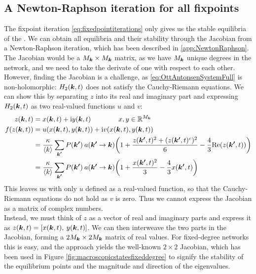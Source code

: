 \subsection{A Newton-Raphson iteration for all fixpoints}
The fixpoint iteration \eqref{eq:fixedpointiterations} only gives us the stable equilibria of the \MFR. We can obtain all equilibria and their stability through the Jacobian from a Newton-Raphson iteration, which has been described in \ref{app:NewtonRaphson}. The Jacobian would be a $M_{{\boldsymbol{k}}} \times M_{{\boldsymbol{k}}}$ matrix, as we have $M_{{\boldsymbol{k}}}$ unique degrees in the network, and we need to take the derivate of one with respect to each other. However, finding the Jacobian is a challenge, as \eqref{eq:OttAntonsenSystemFull} is non-holomorphic: $H_2({\boldsymbol{k}},t)$ does not satisfy the Cauchy-Riemann equations. We can show this by separating $z$ into its real and imaginary part and expressing $H_2({\boldsymbol{k}},t)$ as two real-valued functions $u$ and $v$:
\begin{align*}
z(\k,t) &= x(\k,t) + \ic y(\k,t) \qquad \qquad x, y \in \R^{M_{\k}}\\
f\left( z(\k,t) \right) &= u\left(x(\k, t), y(\k, t) \right) + \ic v\left(x(\k, t), y(\k, t) \right)\\
&= \frac{\kappa}{\kmean} \sum_{\kacc} P\left(\kacc\right) \: a\left(\kacc \rightarrow \k\right) \left( 1 + \frac{z(\kacc, t)^2 + (z(\kacc, t)^c )^2}{6} - \frac{4}{3} \Re(z(\kacc, t)) \right)\\
&= \frac{\kappa}{\kmean} \sum_{\kacc} P\left(\kacc\right) \: a\left(\kacc \rightarrow \k\right) \left( 1 + \frac{x(\kacc, t)^2}{3} - \frac{4}{3} x(\kacc, t) \right)
\end{align*}
This leaves us with only $u$ defined as a real-valued function, so that the Cauchy-Riemann equations do not hold as $v$ is zero. Thus we cannot express the Jacobian as a matrix of complex numbers. \\

Instead, we must think of $z$ as a vector of real and imaginary parts and express it as $z({\boldsymbol{k}},t) = [ x({\boldsymbol{k}},t), \: y({\boldsymbol{k}},t)]$. We can then interweave the two parts in the Jacobian, forming a $2 M_{{\boldsymbol{k}}} \times 2 M_{{\boldsymbol{k}}}$ matrix of real values. For fixed-degree networks this is easy, and the approach yields the well-known $2 \times 2 $ Jacobian, which has been used in Figure \ref{fig:macroscopicstatesfixeddegree} to signify the stability of the equilibrium points and the magnitude and direction of the eigenvalues. \\

